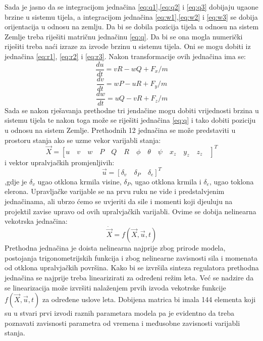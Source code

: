 Sada je jasno da se integracijom jednačina \ref{eq:q1},\ref{eq:q2} i \ref{eq:q3} dobijaju 
ugaone brzine u sistemu tijela, a integracijom jednačina \ref{eq:w1},\ref{eq:w2} i \ref{eq:w3}  se dobija 
orijentacija u odnosu na zemlju. Da bi se dobila pozicija tijela u odnosu na sistem Zemlje
treba riješiti matričnu jednačinu \ref{eq:q}. Da bi se ona mogla numerički riješiti treba 
naći izraze za izvode brzinu u sistemu tijela. Oni se mogu dobiti iz jednačina 
\ref{eq:r1}, \ref{eq:r2} i \ref{eq:r3}. Nakon transformacije ovih jednačina ima se:
\begin{equation}
    \frac{du}{dt}=vR-wQ+F_x/m
\end{equation}
\begin{equation}
    \frac{dv}{dt}=wP-uR+F_y/m
\end{equation}
\begin{equation}
    \frac{dw}{dt}=uQ-vR+F_z/m
\end{equation}
Sada se nakon rješavanja prethodne tri jendačine mogu dobiti vrijednosti brzina u sistemu tijela 
te nakon toga može se riješiti jednačina \ref{eq:q} i tako dobiti poziciju u odnosu na sistem Zemlje.
Prethodnih 12 jednačina se može predstaviti u prostoru stanja ako se uzme vekor varijabli stanja:
\[\vec{X}=\left[ u \quad v\quad w\quad P\quad Q\quad R\quad \phi \quad \theta \quad
 \psi \quad x_z\quad y_z\quad z_z\quad \right]^T\] i vektor upralvjačkih 
promjenljivih:
\[\vec{u}=\left[\delta_v \quad \delta_P\quad \delta_e \right]^T\] 
,gdje je $\delta_v$ ugao otklona krmila visine, $\delta_P$, ugao otklona krmila 
i $\delta_e$, ugao toklona elerona. Upravljačke varijable se na prvu ruku ne vide i predstalvjenim jednačinama, 
ali ubrzo ćemo se uvjeriti da sile i momenti koji djeuluju na projektil zavise upravo od ovih upralvjačkih 
varijabli.  
Ovime se dobija nelinearna vekotrska jednačina:
\begin{equation}
    \dot{\vec{X}}=f(\vec{X},\vec{u},t)
\end{equation}
Prethodna jednačina je doista nelinearna najprije zbog prirode modela, postojanja trigonometrijskih funkcija i 
zbog nelinearne zavisnosti sila i momenata od otklona upralvjačkih površina. Kako bi se izvršila sinteza 
regulatora prethodna jednačina se najprije treba linearizirati za određeni režim leta. Već se nadzire 
da se linearizacija može izvršiti nalaženjem prvih izvoda vekotrske funkcije $f(\vec{X},\vec{u},t)$ za određene uslove leta. 
Dobijena matrica bi imala 144 elementa koji su u stvari prvi izvodi raznih parametara modela pa je evidentno 
da treba poznavati zavisnosti parametra od vremena i međusobne zavisnosti varijabli stanja.  




